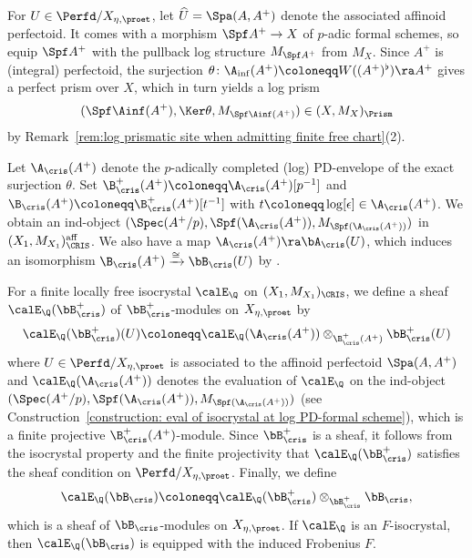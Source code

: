 \begin{construction}
For $U\in \Perfd/X_{\eta,\proet}$, let $\widehat{U}=\Spa(A,A^+)$ denote the associated affinoid perfectoid. It comes with a morphism $\Spf A^+\rightarrow X$ of $p$-adic formal schemes, so equip $\Spf A^+$ with the pullback log structure $M_{\Spf A^+}$ from $M_X$.
Since $A^+$ is (integral) perfectoid, the surjection $\theta\colon \A_{\mathrm{inf}}(A^+)\coloneqq W((A^+)^\flat)\ra A^+$ gives a perfect prism over $X$, which in turn yields a log prism 
\[
(\Spf \Ainf(A^+),\Ker\theta, M_{\Spf \Ainf(A^+)}) \in (X,M_X)_\Prism 
\]
by Remark~\ref{rem:log prismatic site when admitting finite free chart}(2).

Let $\A_{\cris}(A^+)$ denote the $p$-adically completed (log) PD-envelope of the exact surjection $\theta$. 
Set $\B^+_{\cris}(A^+)\coloneqq \A_{\cris}(A^+)[p^{-1}]$ and $\B_{\cris}(A^+)\coloneqq \B_{\cris}^+(A^+)[t^{-1}]$ with $t \coloneqq \operatorname{log}[\epsilon]\in \A_{\cris}(A^+)$. We obtain an ind-object $(\Spec (A^+/p), \Spf(\A_{\cris}(A^+)), M_{\Spf(\A_{\cris}(A^+))})$ in $(X_1,M_{X_1})_{\CRIS}^{\mathrm{aff}}$. We also have a map $\A_{\cris}(A^+)\ra \bA_{\cris}(U)$, which induces an isomorphism $\B_{\cris}(A^+) \xrightarrow{\cong} \bB_{\cris}(U)$ by \cite[Cor.~2.8(2)]{Tan-Tong}. 
\end{construction}


\begin{construction}
For a finite locally free isocrystal $\calE_\Q$ on $(X_1,M_{X_1})_{\CRIS}$, we define a sheaf $\calE_\Q(\bB_\cris^+)$ of $\bB^+_\cris$-modules on $X_{\eta,\proet}$ by
\[
\calE_\Q(\bB_\cris^+)(U)\coloneqq \calE_\Q(\A_{\cris}(A^+))\otimes_{\B_{\cris}^+(A^+)}\bB_\cris^+(U)
\]
where $U\in \Perfd/X_{\eta,\proet}$ is associated to the affinoid perfectoid $\Spa (A,A^+)$ and $\calE_\Q(\A_{\cris}(A^+))$ denotes the evaluation of $\calE_\Q$ on the ind-object $(\Spec (A^+/p), \Spf(\A_{\cris}(A^+)), M_{\Spf(\A_{\cris}(A^+))})$ (see Construction~\ref{construction: eval of isocrystal at log PD-formal scheme}), which is a finite projective $\B_{\cris}^+(A^+)$-module. Since $\bB_\cris^+$ is a sheaf, it follows from the isocrystal property and the finite projectivity that $\calE_\Q(\bB_\cris^+)$ satisfies the sheaf condition on $\Perfd/X_{\eta,\proet}$.
Finally, we define
\[
\calE_\Q(\bB_\cris)\coloneqq \calE_\Q(\bB_\cris^+)\otimes_{\bB_\cris^+}\bB_\cris,
\]
which is a sheaf of $\bB_\cris$-modules on $X_{\eta,\proet}$.
If $\calE_\Q$ is an $F$-isocrystal, then $\calE_\Q(\bB_{\cris})$ is equipped with the induced Frobenius $F$.
\end{construction}

